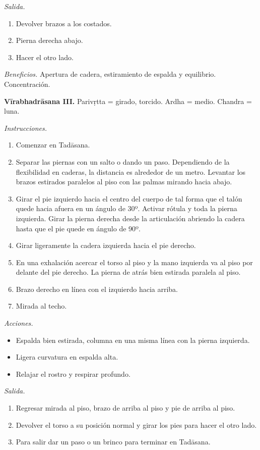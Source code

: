 \emph{Salida.}
\begin{enumerate}
\item Devolver brazos a los costados.
\item Pierna derecha abajo.
\item Hacer el otro lado.
\end{enumerate}

\emph{Beneficios.} Apertura de cadera,
estiramiento de espalda y equilibrio.
Concentración.

\medskip\noindent\textbf{Vīrabhadrāsana III.}
Parivṛtta = girado, torcido. Ardha = medio.
Chandra = luna.

\emph{Instrucciones.}
\begin{enumerate}
\item Comenzar en Tadāsana.
\item Separar las piernas con un salto o
dando un paso. Dependiendo de la flexibilidad
en caderas, la distancia es alrededor de un
metro. Levantar los brazos estirados
paralelos al piso con las palmas mirando
hacia abajo.
\item Girar el pie izquierdo hacia el centro
del cuerpo de tal forma que el talón quede
hacia afuera en un ángulo de 30º. Activar
rótula y toda la pierna izquierda. Girar la
pierna derecha desde la articulación abriendo
la cadera hasta que el pie quede en ángulo de
90º.
\item Girar ligeramente la
cadera izquierda hacia el pie derecho.
\item En una exhalación acercar el torso al
piso y la mano izquierda va al piso por
delante del pie derecho. La pierna de atrás
bien estirada paralela al piso.
\item Brazo derecho en línea con el izquierdo
hacia arriba.
\item Mirada al techo.
\end{enumerate}

\emph{Acciones.}
\begin{itemize}
\item Espalda bien estirada, columna en una
misma línea con la pierna izquierda.
\item Ligera curvatura en espalda alta.
\item Relajar el rostro y respirar profundo.
\end{itemize}

\emph{Salida.}
\begin{enumerate}
\item Regresar mirada al piso, brazo de
arriba al piso y pie de arriba al piso.
\item Devolver el torso a su posición normal
y girar los pies para hacer el otro lado.
\item Para salir dar un paso o un brinco para
terminar en Tadāsana.
\end{enumerate}

